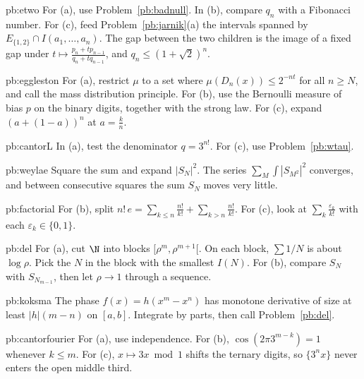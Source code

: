 \begin{hint}{pb:etwo}
For (a), use Problem~\ref{pb:badnull}. In (b), compare $q_n$ with a Fibonacci number. For (c), feed Problem~\ref{pb:jarnik}(a) the intervals spanned by $E_{\{1,2\}}\cap I(a_1,\dots,a_n)$. The gap between the two children is the image of a fixed gap under $t\mapsto\frac{p_n+tp_{n-1}}{q_n+tq_{n-1}}$, and $q_n\le(1+\sqrt2)^n$.
\end{hint}

\begin{hint}{pb:eggleston}
For (a), restrict $\mu$ to a set where $\mu(D_n(x))\le2^{-nt}$ for all $n\ge N$, and call the mass distribution principle. For (b), use the Bernoulli measure of bias $p$ on the binary digits, together with the strong law. For (c), expand $(a+(1-a))^n$ at $a=\frac kn$.
\end{hint}

\begin{hint}{pb:cantorL}
In (a), test the denominator $q=3^{n!}$. For (c), use Problem~\ref{pb:wtau}.
\end{hint}

\begin{hint}{pb:weylae}
Square the sum and expand $|S_N|^2$. The series $\sum_M\int|S_{M^2}|^2$ converges, and between consecutive squares the sum $S_N$ moves very little.
\end{hint}

\begin{hint}{pb:factorial}
For (b), split $n!\,e=\sum_{k\le n}\frac{n!}{k!}+\sum_{k>n}\frac{n!}{k!}$. For (c), look at $\sum_k\frac{\varepsilon_k}{k!}$ with each $\varepsilon_k\in\{0,1\}$.
\end{hint}

\begin{hint}{pb:del}
For (a), cut $\N$ into blocks $[\rho^m,\rho^{m+1}[$. On each block, $\sum 1/N$ is about $\log\rho$. Pick the $N$ in the block with the smallest $I(N)$. For (b), compare $S_N$ with $S_{N_{m-1}}$, then let $\rho\to1$ through a sequence.
\end{hint}

\begin{hint}{pb:koksma}
The phase $f(x)=h(x^m-x^n)$ has monotone derivative of size at least $|h|(m-n)$ on $[a,b]$. Integrate by parts, then call Problem~\ref{pb:del}.
\end{hint}

\begin{hint}{pb:cantorfourier}
For (a), use independence. For (b), $\cos(2\pi 3^{m-k})=1$ whenever $k\le m$. For (c), $x\mapsto 3x\bmod 1$ shifts the ternary digits, so $\{3^nx\}$ never enters the open middle third.
\end{hint}


